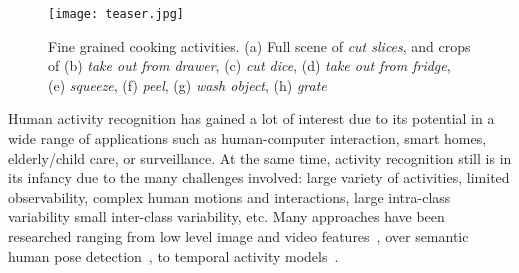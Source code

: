  
 
\begin{figure}[t]
\begin{center}
  \texttt{[image: teaser.jpg]}
  \caption[Examples of fine grained cooking activities.]{Fine grained cooking activities.  (a) Full scene of \emph{cut slices}, and crops of (b) \emph{take out from drawer}, (c) \emph{cut dice}, (d) \emph{take out from fridge}, (e) \emph{squeeze}, (f) \emph{peel}, (g) \emph{wash object}, (h) \emph{grate}\vspace{-0.6cm}}
  \label{fig:cvpr12:teaser}
\end{center}
\end{figure}

Human activity recognition has gained a lot of interest due to its potential in a wide range 
of applications such as human-computer interaction, smart homes, elderly/child care, or
surveillance. At the same time, activity recognition still 
is in its infancy due to the many challenges involved: large variety of activities, limited observability, 
complex human motions and interactions, large intra-class variability \vs small inter-class variability, etc. 
%  
Many approaches have been researched ranging from 
low level image and video features~\citep{chakraborty11iccv,laptev05ijcv,wang11cvpr}, 
over semantic human pose detection~\citep{singh11iccv}, 
to temporal activity models~\citep{gehrig09hr,niebles10eccv,si11iccv}.


